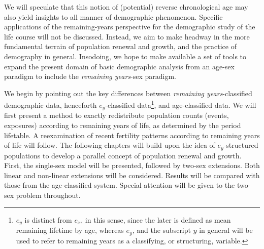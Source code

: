 We will speculate that this notion of (potential) reverse chronological age may
also yield insights to all manner of demographic phenomenon. Specific
applications of the remaining-years perspective for the demographic study 
of the life course will not be discussed. Instead, we aim to make headway in 
the more fundamental terrain of population renewal and growth, and the 
practice of demography in general.
Insodoing, we hope to make available a set of tools to expand the present domain
of basic demographic analysis from an age-sex paradigm to include the
\textit{remaining years}-sex paradigm.

We begin by pointing out the key differences
between \textit{remaining years}-classified demographic data,
henceforth $e_y$-classified data\footnote{$e_y$ is distinct from $e_x$, in
this sense, since the later is defined as mean remaining lifetime by age,
whereas $e_y$, and the subscript $y$ in general will be used to refer to
remaining years as a classifying, or structuring, variable.}, and age-classified
data. We will first present a method to exactly redistribute population 
counts (events, exposures) according to remaining years of life, as determined
by the period lifetable. A reexamination of recent fertility patterns according
to remaining years of life will follow. The following chapters will build upon 
the idea of $e_y$-structured populations
to develop a parallel concept of population renewal and growth. First, the
single-sex model will be presented, followed by two-sex extensions. Both linear and
non-linear extensions will be considered. Results will be compared with those
from the age-classified system. Special attention will be given to the two-sex
problem throughout.


